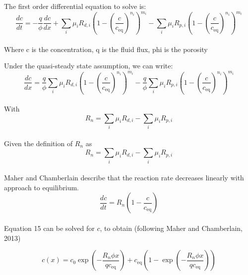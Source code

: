 The first order differential equation to solve is:\\ 
\begin{equation}
\frac{dc}{dt} = -\frac{q}{\phi} \frac{dc}{dx} + \sum_{i} \mu_i R_{d,i} \left( 1 - \left( \frac{c}{c_{\text{eq}}} \right)^{n_i} \right)^{m_i} - \sum_{i} \mu_i R_{p,i} \left( 1 - \left( \frac{c}{c_{\text{eq}}} \right)^{n_i} \right)^{m_i}
\end{equation}\\

Where c is the concentration, q is the fluid flux, phi is the porosity

\bsk

Under the quasi-steady state assumption, we can write: \\

\begin{equation}
\frac{dc}{dx} =  \frac{q}{\phi}\sum_{i} \mu_i R_{d,i} \left( 1 - \left( \frac{c}{c_{\text{eq}}} \right)^{n_i} \right)^{m_i} - \frac{q}{\phi}\sum_{i} \mu_i R_{p,i} \left( 1 - \left( \frac{c}{c_{\text{eq}}} \right)^{n_i} \right)^{m_i}
\end{equation} \\

With \\

\begin{equation}
R_n = \sum_{i} \mu_i R_{d,i} - \sum_{i} \mu_i R_{p,i}
\end{equation} \\

Given the definition of \( R_n \) as \\

\begin{equation}
R_n = \sum_{i} \mu_i R_{d,i} - \sum_{i} \mu_i R_{p,i}
\end{equation} \\

Maher and Chamberlain describe that the reaction rate decreases linearly with approach to equilibrium. \\

\begin{equation}
\frac{dc}{dt} = R_n \left( 1 - \frac{c}{c_{\text{eq}}} \right)
\end{equation} \\

Equation 15 can be solved for \( c \), to obtain (following Maher and Chamberlain, 2013)

\begin{equation}
c(x) = c_0 \exp\left(-\frac{R_n \phi x}{q c_{\text{eq}}} \right) + c_{\text{eq}} \left( 1 - \exp\left(-\frac{R_n \phi x}{q c_{\text{eq}}} \right) \right)
\end{equation} \\

